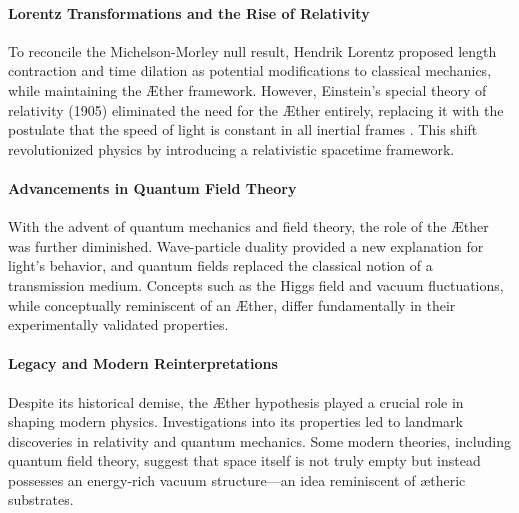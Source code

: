     \paragraph*{Lorentz Transformations and the Rise of Relativity}
    To reconcile the Michelson-Morley null result, Hendrik Lorentz proposed length contraction and time dilation as potential modifications to classical mechanics, while maintaining the Æther framework. However, Einstein's special theory of relativity (1905) eliminated the need for the Æther entirely, replacing it with the postulate that the speed of light is constant in all inertial frames \cite{einstein1905}. This shift revolutionized physics by introducing a relativistic spacetime framework.

    \paragraph*{Advancements in Quantum Field Theory}
    With the advent of quantum mechanics and field theory, the role of the Æther was further diminished. Wave-particle duality provided a new explanation for light's behavior, and quantum fields replaced the classical notion of a transmission medium. Concepts such as the Higgs field \cite{higgs1964} and vacuum fluctuations, while conceptually reminiscent of an Æther, differ fundamentally in their experimentally validated properties.

    \paragraph*{Legacy and Modern Reinterpretations}
    Despite its historical demise, the Æther hypothesis played a crucial role in shaping modern physics. Investigations into its properties led to landmark discoveries in relativity and quantum mechanics. Some modern theories, including quantum field theory, suggest that space itself is not truly empty but instead possesses an energy-rich vacuum structure—an idea reminiscent of ætheric substrates.